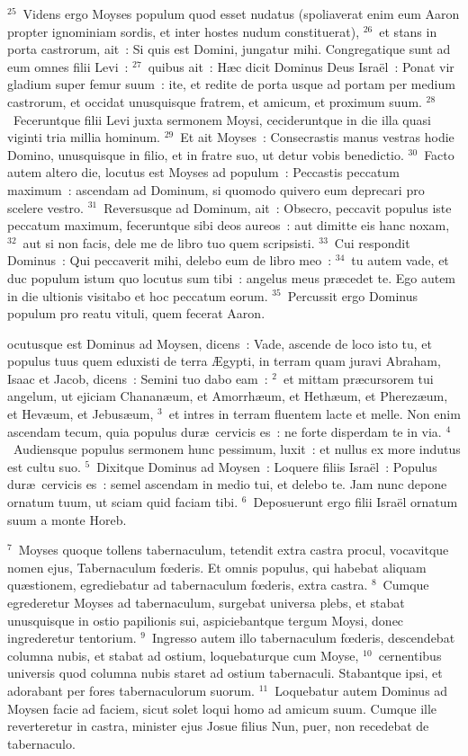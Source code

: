 ${}^{25}$~Videns ergo Moyses populum quod esset nudatus (spoliaverat enim eum Aaron propter ignominiam sordis, et inter hostes nudum constituerat),
${}^{26}$~et stans in porta castrorum, ait~: Si quis est Domini, jungatur mihi. Congregatique sunt ad eum omnes filii Levi~:
${}^{27}$~quibus ait~: H\ae c dicit Dominus Deus Isra\"el~: Ponat vir gladium super femur suum~: ite, et redite de porta usque ad portam per medium castrorum, et occidat unusquisque fratrem, et amicum, et proximum suum.
${}^{28}$~Feceruntque filii Levi juxta sermonem Moysi, cecideruntque in die illa quasi viginti tria millia hominum.
${}^{29}$~Et ait Moyses~: Consecrastis manus vestras hodie Domino, unusquisque in filio, et in fratre suo, ut detur vobis benedictio.
${}^{30}$~Facto autem altero die, locutus est Moyses ad populum~: Peccastis peccatum maximum~: ascendam ad Dominum, si quomodo quivero eum deprecari pro scelere vestro.
${}^{31}$~Reversusque ad Dominum, ait~: Obsecro, peccavit populus iste peccatum maximum, feceruntque sibi deos aureos~: aut dimitte eis hanc noxam,
${}^{32}$~aut si non facis, dele me de libro tuo quem scripsisti.
${}^{33}$~Cui respondit Dominus~: Qui peccaverit mihi, delebo eum de libro meo~:
${}^{34}$~tu autem vade, et duc populum istum quo locutus sum tibi~: angelus meus pr\ae cedet te. Ego autem in die ultionis visitabo et hoc peccatum eorum.
${}^{35}$~Percussit ergo Dominus populum pro reatu vituli, quem fecerat Aaron.

\bchapter
{}ocutusque est Dominus ad Moysen, dicens~: Vade, ascende de loco isto tu, et populus tuus quem eduxisti de terra \AE gypti, in terram quam juravi Abraham, Isaac et Jacob, dicens~: Semini tuo dabo eam~:
${}^{2}$~et mittam pr\ae cursorem tui angelum, ut ejiciam Chanan\ae um, et Amorrh\ae um, et Heth\ae um, et Pherez\ae um, et Hev\ae um, et Jebus\ae um,
${}^{3}$~et intres in terram fluentem lacte et melle. Non enim ascendam tecum, quia populus dur\ae\ cervicis es~: ne forte disperdam te in via.
${}^{4}$~Audiensque populus sermonem hunc pessimum, luxit~: et nullus ex more indutus est cultu suo.
${}^{5}$~Dixitque Dominus ad Moysen~: Loquere filiis Isra\"el~: Populus dur\ae\ cervicis es~: semel ascendam in medio tui, et delebo te. Jam nunc depone ornatum tuum, ut sciam quid faciam tibi.
${}^{6}$~Deposuerunt ergo filii Isra\"el ornatum suum a monte Horeb.


${}^{7}$~Moyses quoque tollens tabernaculum, tetendit extra castra procul, vocavitque nomen ejus, Tabernaculum fœderis. Et omnis populus, qui habebat aliquam qu\ae stionem, egrediebatur ad tabernaculum fœderis, extra castra.
${}^{8}$~Cumque egrederetur Moyses ad tabernaculum, surgebat universa plebs, et stabat unusquisque in ostio papilionis sui, aspiciebantque tergum Moysi, donec ingrederetur tentorium.
${}^{9}$~Ingresso autem illo tabernaculum fœderis, descendebat columna nubis, et stabat ad ostium, loquebaturque cum Moyse,
${}^{10}$~cernentibus universis quod columna nubis staret ad ostium tabernaculi. Stabantque ipsi, et adorabant per fores tabernaculorum suorum.
${}^{11}$~Loquebatur autem Dominus ad Moysen facie ad faciem, sicut solet loqui homo ad amicum suum. Cumque ille reverteretur in castra, minister ejus Josue filius Nun, puer, non recedebat de tabernaculo.


